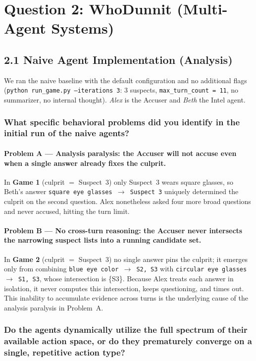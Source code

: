 \documentclass[11pt]{article}
\begin{document}
\newpage
\section*{Question 2: WhoDunnit (Multi-Agent Systems)}

\subsection*{2.1 \quad Naive Agent Implementation (Analysis)}

We ran the naive baseline with the default configuration and no additional flags
(\texttt{python run\_game.py --iterations 3}: 3 suspects, \texttt{max\_turn\_count = 11},
no summarizer, no internal thought). \emph{Alex} is the Accuser and \emph{Beth} the Intel
agent.

\subsubsection*{What specific behavioral problems did you identify in the initial run of the
naive agents?}

\paragraph{Problem A --- Analysis paralysis: the Accuser will not accuse even when a single
answer already fixes the culprit.} In \textbf{Game 1} (culprit $=$ Suspect~3) only Suspect~3
wears square glasses, so Beth's answer \texttt{square eye glasses $\rightarrow$ Suspect 3}
uniquely determined the culprit on the second question. Alex nonetheless asked four more
broad questions and never accused, hitting the turn limit.

\paragraph{Problem B --- No cross-turn reasoning: the Accuser never intersects the narrowing
suspect lists into a running candidate set.} In \textbf{Game 2} (culprit $=$ Suspect~3) no
single answer pins the culprit; it emerges only from combining
\texttt{blue eye color $\rightarrow$ S2, S3} with \texttt{circular eye glasses $\rightarrow$
S1, S3}, whose intersection is \{S3\}. Because Alex treats each answer in isolation, it never
computes this intersection, keeps questioning, and times out. This inability to accumulate
evidence across turns is the underlying cause of the analysis paralysis in Problem~A.

\subsubsection*{Do the agents dynamically utilize the full spectrum of their available action
space, or do they prematurely converge on a single, repetitive action type?}
\end{document}
